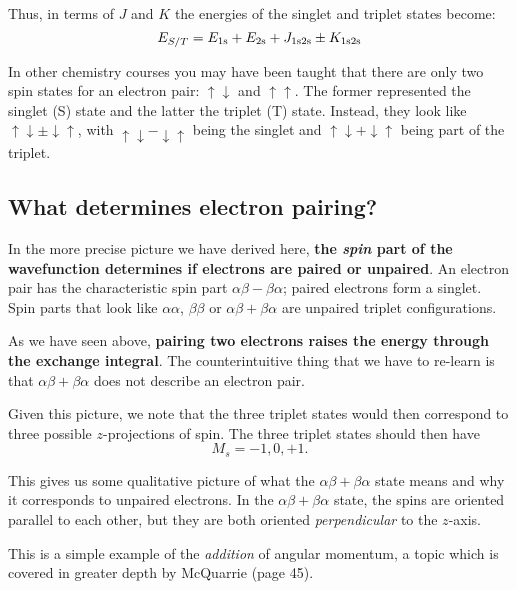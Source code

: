 \documentclass[a4paper]{tufte-handout}
\theoremstyle{definition}
\begin{document}
Thus, in terms of $J$ and $K$ the energies of the singlet and triplet states become:
\begin{equation*}
  E_{S/T} = E_{1\ce{s}} + E_{2\ce{s}} + J_{1\ce{s}2\ce{s}} \pm  K_{1\ce{s}2\ce{s}}
\end{equation*}

In other chemistry courses you may have been taught that there are only two spin states for an electron pair: $\uparrow \downarrow$ and $\uparrow \uparrow$. The
former represented the singlet (S) state and the latter the triplet (T) state. 
Instead, they look like $\uparrow \downarrow \pm \downarrow \uparrow$, with $\uparrow \downarrow - \downarrow \uparrow$ being the singlet and
$\uparrow \downarrow + \downarrow \uparrow$ being part of the triplet.

\subsection*{What determines electron pairing?}

In the more precise picture we have derived here, \textbf{the \textit{spin} part of the wavefunction determines 
if electrons are paired or unpaired}. An electron pair has the characteristic spin part $\alpha \beta - \beta \alpha$; paired 
electrons form a singlet. Spin parts that look like $\alpha \alpha$, $\beta \beta$ or $\alpha \beta + \beta \alpha$ are unpaired triplet configurations.

As we have seen above,  \textbf{pairing two electrons raises the energy through the exchange integral}. The
counterintuitive thing that we have to re-learn is that $\alpha \beta + \beta \alpha$ does not describe an electron pair.

Given this picture, we note that the three triplet states would then correspond to three possible $z$-projections of spin. The three triplet states should then have
\begin{equation*}
  M_s = -1, 0, +1.
\end{equation*}

This gives us some qualitative picture of what the $\alpha \beta + \beta \alpha$ state means and why it corresponds to unpaired electrons. In the
$\alpha \beta + \beta \alpha$ state, the spins are oriented parallel to each other, but they are both oriented \textit{perpendicular} to the $z$-axis.

This is a simple example of the \textit{addition} of angular momentum, a topic which is covered in greater depth by McQuarrie (page 45).



\end{document}

